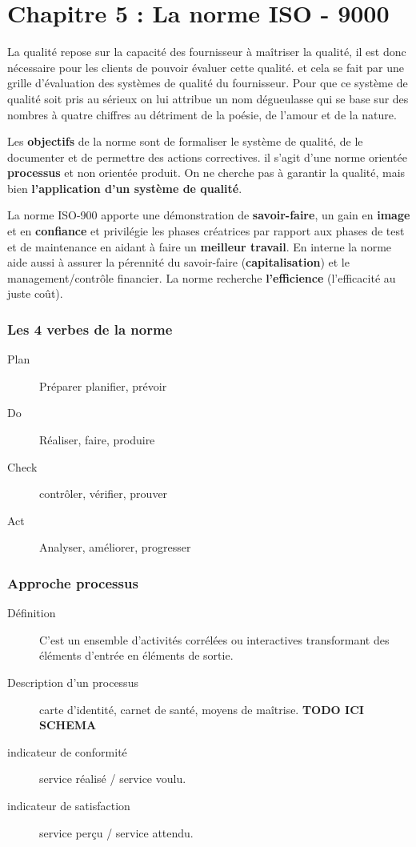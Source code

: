 \part{Chapitre 5 : La norme ISO - 9000}

La qualité repose sur la capacité des fournisseur à maîtriser la qualité, il est donc nécessaire pour les clients de pouvoir évaluer cette qualité. et cela se fait par une grille d’évaluation des systèmes de qualité du fournisseur. Pour que ce système de qualité soit pris au sérieux on lui attribue un nom dégueulasse qui se base sur des nombres à quatre chiffres au détriment de la poésie, de l’amour et de la nature.

Les \textbf{objectifs} de la norme sont de formaliser le système de qualité, de le documenter et de permettre des  actions correctives. il s’agit d’une norme orientée \textbf{processus} et non orientée produit. On ne cherche pas à garantir la qualité, mais bien \textbf{l’application d’un système de qualité}.

La norme ISO-900 apporte une démonstration de \textbf{savoir-faire}, un gain en \textbf{image} et en \textbf{confiance} et privilégie les phases créatrices par rapport aux phases de test et de maintenance en aidant à faire un \textbf{meilleur travail}. En interne la norme aide aussi à assurer la pérennité du savoir-faire (\textbf{capitalisation}) et le management/contrôle financier. La norme recherche \textbf{l’efficience} (l'efficacité au juste coût).

\section{Les 4 verbes de la norme}
\begin{description}
	\item[Plan] Préparer planifier, prévoir
	\item[Do] Réaliser, faire, produire
	\item[Check] contrôler, vérifier, prouver
	\item[Act] Analyser, améliorer, progresser
\end{description}



\section{Approche processus}
\begin{description}
\item[Définition]C’est un ensemble d'activités corrélées ou interactives transformant des éléments d'entrée en éléments de sortie.
\item[Description d’un processus] carte d'identité, carnet de santé, moyens de maîtrise.
\textbf{TODO ICI SCHEMA}
\item[indicateur de conformité] service réalisé / service voulu.
\item[indicateur de satisfaction] service perçu / service attendu.
\end{description}


